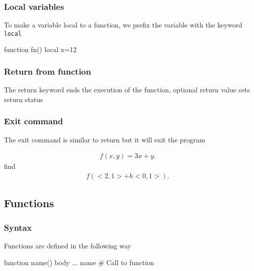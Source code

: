 \documentclass{report}
\begin{document}
    \subsubsection{Local variables}
    \bigbreak \noindent 
    To make a variable local to a function, we prefix the variable with the keyword \texttt{local}
    \bigbreak \noindent 
    \begin{bashcode}
    function fn() {
        local x=12
    }
    \end{bashcode}

    \bigbreak \noindent 
    \subsubsection{Return from function}
    \bigbreak \noindent 
    The return keyword ends the execution of the function, optional return value sets return status

    \bigbreak \noindent 
    \subsubsection{Exit command}
    \bigbreak \noindent 
    The exit command is similar to return but it will exit the program

    \begin{align*}
        f(x,y) = 3x+y
    .\end{align*}
    find 
    \begin{align*}
        f(<2,1> + h<0,1>)
    .\end{align*}


    \bigbreak \noindent 
    \subsection{Functions}
    \bigbreak \noindent 
    \subsubsection{Syntax}
    \bigbreak \noindent 
    Functions are defined in the following way
    \bigbreak \noindent 
    \begin{bashcode}
        function name() {
            body ...
        }
        name # Call to function
    \end{bashcode}

    \bigbreak \noindent 
\end{document}
